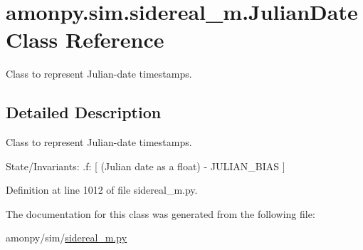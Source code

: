 \hypertarget{classamonpy_1_1sim_1_1sidereal__m_1_1_julian_date}{\section{amonpy.\-sim.\-sidereal\-\_\-m.\-Julian\-Date Class Reference}
\label{classamonpy_1_1sim_1_1sidereal__m_1_1_julian_date}
}


Class to represent Julian-\/date timestamps.  




\subsection{Detailed Description}
Class to represent Julian-\/date timestamps. 

State/\-Invariants\-: .f\-: \mbox{[} (Julian date as a float) -\/ J\-U\-L\-I\-A\-N\-\_\-\-B\-I\-A\-S \mbox{]} 

Definition at line 1012 of file sidereal\-\_\-m.\-py.



The documentation for this class was generated from the following file\-:\begin{DoxyCompactItemize}
\item 
amonpy/sim/\hyperlink{sidereal__m_8py}{sidereal\-\_\-m.\-py}\end{DoxyCompactItemize}
